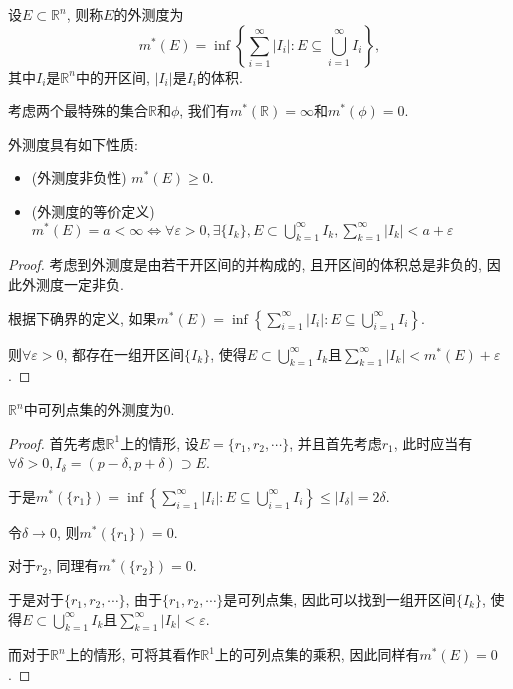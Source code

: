 \documentclass[theorem=false,mathfont=none,openany,sub3section]{easybook}
\begin{document}
\begin{definition}
  设$E\subset \mathbb{R}^n$, 则称$E$的外测度为
  \begin{equation*}
    m^{*}(E)=\inf\left\{\sum_{i=1}^{\infty}|I_i|: E\subseteq \bigcup_{i=1}^{\infty}I_i\right\},
  \end{equation*}
  其中$I_i$是$\mathbb{R}^n$中的开区间, $|I_i|$是$I_i$的体积.\par
\end{definition}

\begin{example}
  考虑两个最特殊的集合$\mathbb{R}$和$\phi$, 我们有$m^{*}(\mathbb{R})=\infty$和$m^{*}(\phi)=0$.\par
\end{example}

\begin{proposition}
  外测度具有如下性质:\par
  \begin{itemize}
    \item (外测度非负性) $m^{*}(E)\geqslant 0$.
    \item (外测度的等价定义) $m^{*}(E)=a<\infty \Leftrightarrow \forall \varepsilon >0, \exists \{I_k\}, E\subset \bigcup_{k=1}^{\infty}I_k, \sum_{k=1}^{\infty}|I_k|<a+\varepsilon$
  \end{itemize}
\end{proposition}

\begin{proof}
  考虑到外测度是由若干开区间的并构成的, 且开区间的体积总是非负的, 因此外测度一定非负.\par
  根据下确界的定义, 如果$m^{*}(E)=\inf\left\{\sum_{i=1}^{\infty}|I_i|: E\subseteq \bigcup_{i=1}^{\infty}I_i\right\}$.\par
  则$\forall \varepsilon >0$, 都存在一组开区间$\{I_k\}$, 使得$E\subset \bigcup_{k=1}^{\infty}I_k$且$\sum_{k=1}^{\infty}|I_k|<m^{*}(E)+\varepsilon$.\par
\end{proof}

\begin{corollary}
  $\mathbb{R}^n$中可列点集的外测度为0.\par
\end{corollary}

\begin{proof}
  首先考虑$\mathbb{R}^1$上的情形, 设$E=\{r_1,r_2,\cdots\}$, 并且首先考虑$r_1$, 此时应当有$\forall \delta >0, I_{\delta} = (p-\delta,p+\delta)\supset E$.\par
  于是$m^{*}(\{r_1\})=\inf\left\{\sum_{i=1}^{\infty}|I_i|: E\subseteq \bigcup_{i=1}^{\infty}I_i\right\}\leqslant |I_{\delta}|=2\delta.$\par
  令$\delta \to 0$, 则$m^{*}(\{r_1\})=0$.\par
  对于$r_2$, 同理有$m^{*}(\{r_2\})=0$.\par
  于是对于$\{r_1,r_2,\cdots\}$, 由于$\{r_1,r_2,\cdots\}$是可列点集, 因此可以找到一组开区间$\{I_k\}$, 使得$E\subset \bigcup_{k=1}^{\infty}I_k$且$\sum_{k=1}^{\infty}|I_k|<\varepsilon$.\par
  而对于$\mathbb{R}^n$上的情形, 可将其看作$\mathbb{R}^1$上的可列点集的乘积, 因此同样有$m^{*}(E)=0$.\par
\end{proof}
\end{document}
